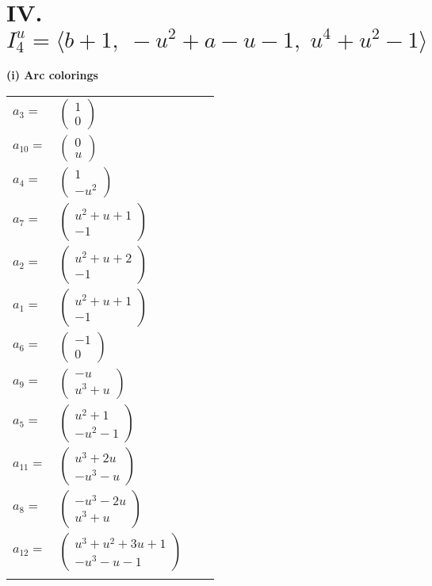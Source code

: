 \documentclass[1p]{elsarticle_modified}
\theoremstyle{definition}
\begin{document}
\centering \section*{IV. $I^u_{4}= \langle b+1,\;- u^2+a- u-1,\;u^4+u^2-1 \rangle$}
\flushleft \textbf{(i) Arc colorings}\\
\begin{tabular}{m{7pt} m{180pt} m{7pt} m{180pt} }
\flushright $a_{3}=$&$\begin{pmatrix}1\\0\end{pmatrix}$ \\
\flushright $a_{10}=$&$\begin{pmatrix}0\\u\end{pmatrix}$ \\
\flushright $a_{4}=$&$\begin{pmatrix}1\\- u^2\end{pmatrix}$ \\
\flushright $a_{7}=$&$\begin{pmatrix}u^2+u+1\\-1\end{pmatrix}$ \\
\flushright $a_{2}=$&$\begin{pmatrix}u^2+u+2\\-1\end{pmatrix}$ \\
\flushright $a_{1}=$&$\begin{pmatrix}u^2+u+1\\-1\end{pmatrix}$ \\
\flushright $a_{6}=$&$\begin{pmatrix}-1\\0\end{pmatrix}$ \\
\flushright $a_{9}=$&$\begin{pmatrix}- u\\u^3+u\end{pmatrix}$ \\
\flushright $a_{5}=$&$\begin{pmatrix}u^2+1\\- u^2-1\end{pmatrix}$ \\
\flushright $a_{11}=$&$\begin{pmatrix}u^3+2 u\\- u^3- u\end{pmatrix}$ \\
\flushright $a_{8}=$&$\begin{pmatrix}- u^3-2 u\\u^3+u\end{pmatrix}$ \\
\flushright $a_{12}=$&$\begin{pmatrix}u^3+u^2+3 u+1\\- u^3- u-1\end{pmatrix}$\\&\end{tabular}
\end{document}
